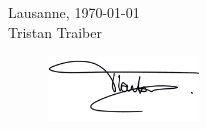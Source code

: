 \documentclass[a4paper,12pt,oneside]{report}
\begin{document}
    \tabto{8cm}Lausanne, \today\\
    \tabto{8cm}Tristan Traiber \\
    
    \begin{flushright}
    \begin{figure}[H]
       \tabto{8cm} \includegraphics[width=4.0cm]{Include/Figure/logo/SignatureTR.PNG}
    \end{figure}
    \end{flushright}

\begin{otherlanguage}{english}
	
	
\end{otherlanguage}


\begin{otherlanguage}{english}
	\listoffigures
	\listoftables
\end{otherlanguage}    
   
	
	\newpage
	
	
	\newpage
	
\end{document}
